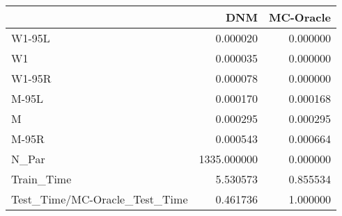 \begin{tabular}{lrr}
\toprule
{} &          DNM &  MC-Oracle \\
\midrule
W1-95L                        &     0.000020 &   0.000000 \\
W1                            &     0.000035 &   0.000000 \\
W1-95R                        &     0.000078 &   0.000000 \\
M-95L                         &     0.000170 &   0.000168 \\
M                             &     0.000295 &   0.000295 \\
M-95R                         &     0.000543 &   0.000664 \\
N\_Par                         &  1335.000000 &   0.000000 \\
Train\_Time                    &     5.530573 &   0.855534 \\
Test\_Time/MC-Oracle\_Test\_Time &     0.461736 &   1.000000 \\
\bottomrule
\end{tabular}
